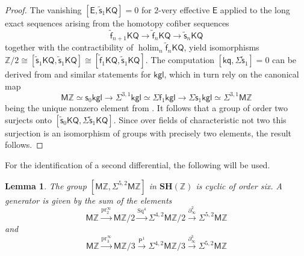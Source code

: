 \documentclass[11pt,hyp,english]{article}
\newcommand{\E}{\mathsf{E}}
\newcommand{\Z}{\mathbb{Z}}
\newcommand{\kgl}{\mathsf{kgl}}
\newcommand{\KQ}{\mathsf{KQ}}
\newcommand{\kq}{\mathsf{kq}}
\newcommand{\MZ}{\mathsf{M}\Z}
\newcommand{\SH}{\mathbf{SH}}
\newcommand{\holim}{\operatorname{holim}}
\newcommand{\Sq}{\operatorname{Sq}}
\newcommand{\pr}{\operatorname{pr}}
\newcommand{\s}{\mathsf{s}}
\newcommand{\vs}{\tilde{\mathsf{s}}}
\newcommand{\f}{\mathsf{f}}
\newcommand{\vf}{\tilde{{\mathsf{f}}}}
\let\iso=\cong
\newtheorem{lemma}[theorem]{Lemma}
\theoremstyle{definition}
\begin{document}
\begin{proof}
The vanishing $[\E,\vs_{1}\KQ]=0$ for $2$-very effective $\E$ \cite[Lemma 7]{Bachmann} applied 
to the long exact sequences arising from the homotopy cofiber sequences
\[ \vf_{n+1}\KQ \to \vf_n\KQ \to \vs_n\KQ \]
together with the contractibility of $\holim_n \vf_n\KQ$, yield isomorphisms
$\Z/2\iso [\vs_1\KQ,\vs_1\KQ] \iso [\vf_1\KQ,\vs_1\KQ]$.
The computation $[\kq,\Sigma\vs_1]=0$ can be derived from  and similar statements for $\kgl$, which in turn rely on the canonical map 
\[ \MZ\simeq \s_0\kgl \to \Sigma^{3,1}\kgl \simeq \Sigma\f_1\kgl \to \Sigma\s_1\kgl\simeq \Sigma^{3,1}\MZ\]
being the unique nonzero element from .
It follows that a group of order two surjects onto $[\vs_{0}\KQ,\Sigma\vs_{1}\KQ]$.
Since over fields of characteristic not two this surjection is an isomorphism of groups with 
precisely two elements, the result follows.
\end{proof}

For the identification of a second differential, the following will be used.

\begin{lemma}\label{lem:endo-weight2-mz}
The group $[\MZ,\Sigma^{5,2}\MZ]$ in $\SH(\Z)$ is cyclic of order six.
A generator is given by the sum of the elements
\[ \MZ\xrightarrow{\pr^\infty_2}\MZ/2\xrightarrow{\Sq^4}\Sigma^{4,2}\MZ/2\xrightarrow{\partial^2_\infty} \Sigma^{5,2}\MZ\]
and 
\[ \MZ\xrightarrow{\pr^\infty_3}\MZ/3
\xrightarrow{{\mathsf{P}}^1}\Sigma^{4,2}\MZ/3\xrightarrow{\partial^3_\infty}\Sigma^{5,2}\MZ\]
\end{lemma}
\end{document}
